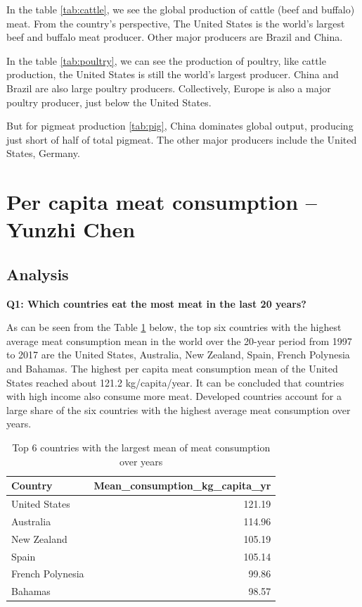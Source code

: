 \documentclass[11pt,a4paper,]{article}
\begin{document}
In the table \ref{tab:cattle}, we see the global production of cattle (beef and buffalo) meat. From the country's perspective, The United States is the world's largest beef and buffalo meat producer. Other major producers are Brazil and China.

In the table \ref{tab:poultry}, we can see the production of poultry, like cattle production, the United States is still the world's largest producer. China and Brazil are also large poultry producers. Collectively, Europe is also a major poultry producer, just below the United States.

But for pigmeat production \ref{tab:pig}, China dominates global output, producing just short of half of total pigmeat. The other major producers include the United States, Germany.
\clearpage

\section*{Per capita meat consumption -- Yunzhi Chen}

\subsection*{Analysis}

\textbf{Q1: Which countries eat the most meat in the last 20 years? }

As can be seen from the Table \ref{tab:highest-meanconsumption} below, the top six countries with the highest average meat consumption mean in the world over the 20-year period from 1997 to 2017 are the United States, Australia, New Zealand, Spain, French Polynesia and Bahamas. The highest per capita meat consumption mean of the United States reached about 121.2 kg/capita/year. It can be concluded that countries with high income also consume more meat. Developed countries account for a large share of the six countries with the highest average meat consumption over years.

\begin{table}

\caption{\label{tab:highest-meanconsumption}Top 6 countries with the largest mean of meat consumption over years}
\centering
\begin{tabular}[t]{l|r}
\hline
Country & Mean\_consumption\_kg\_capita\_yr\\
\hline
United States & 121.19\\
\hline
Australia & 114.96\\
\hline
New Zealand & 105.19\\
\hline
Spain & 105.14\\
\hline
French Polynesia & 99.86\\
\hline
Bahamas & 98.57\\
\hline
\end{tabular}
\end{table}
\clearpage
\end{document}
